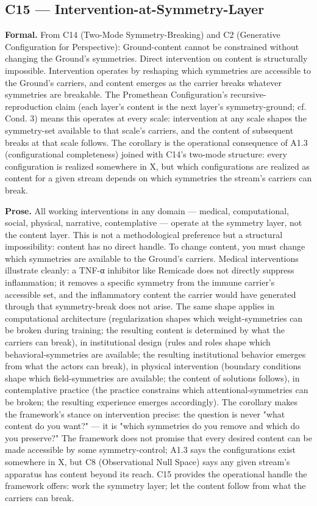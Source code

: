\documentclass[11pt, openany]{book}
\begin{document}
\subsection{C15 --- Intervention-at-Symmetry-Layer}

\textbf{Formal.} From C14 (Two-Mode Symmetry-Breaking) and C2 (Generative Configuration for Perspective): Ground-content cannot be constrained without changing the Ground's symmetries. Direct intervention on content is structurally impossible. Intervention operates by reshaping which symmetries are accessible to the Ground's carriers, and content emerges as the carrier breaks whatever symmetries are breakable. The Promethean Configuration's recursive-reproduction claim (each layer's content is the next layer's symmetry-ground; cf. Cond. 3) means this operates at every scale: intervention at any scale shapes the symmetry-set available to that scale's carriers, and the content of subsequent breaks at that scale follows. The corollary is the operational consequence of A1.3 (configurational completeness) joined with C14's two-mode structure: every configuration is realized somewhere in X, but which configurations are realized as content for a given stream depends on which symmetries the stream's carriers can break.

\textbf{Prose.} All working interventions in any domain --- medical, computational, social, physical, narrative, contemplative --- operate at the symmetry layer, not the content layer. This is not a methodological preference but a structural impossibility: content has no direct handle. To change content, you must change which symmetries are available to the Ground's carriers. Medical interventions illustrate cleanly: a TNF-α inhibitor like Remicade does not directly suppress inflammation; it removes a specific symmetry from the immune carrier's accessible set, and the inflammatory content the carrier would have generated through that symmetry-break does not arise. The same shape applies in computational architecture (regularization shapes which weight-symmetries can be broken during training; the resulting content is determined by what the carriers can break), in institutional design (rules and roles shape which behavioral-symmetries are available; the resulting institutional behavior emerges from what the actors can break), in physical intervention (boundary conditions shape which field-symmetries are available; the content of solutions follows), in contemplative practice (the practice constrains which attentional-symmetries can be broken; the resulting experience emerges accordingly). The corollary makes the framework's stance on intervention precise: the question is never "what content do you want?" --- it is "which symmetries do you remove and which do you preserve?" The framework does not promise that every desired content can be made accessible by some symmetry-control; A1.3 says the configurations exist somewhere in X, but C8 (Observational Null Space) says any given stream's apparatus has content beyond its reach. C15 provides the operational handle the framework offers: work the symmetry layer; let the content follow from what the carriers can break.
\end{document}
